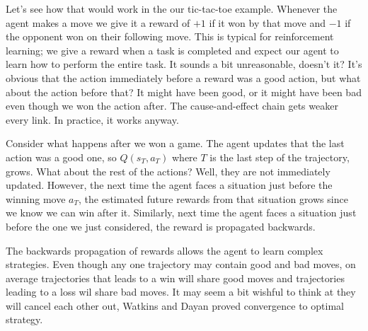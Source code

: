 \documentclass{article}
\theoremstyle{changedot}
\theoremstyle{changedotbreak}
\theoremstyle{nonumberplain}
\begin{document}
Let's see how that would work in the our tic-tac-toe example. Whenever the agent makes a move we give it a reward of $+1$ if it won by that move and $-1$ if the opponent won on their following move. This is typical for reinforcement learning; we give a reward when a task is completed and expect our agent to learn how to perform the entire task. It sounds a bit unreasonable, doesn't it? It's obvious that the action immediately before a reward was a good action, but what about the action before that? It might have been good, or it might have been bad even though we won the action after. The cause-and-effect chain gets weaker every link. In practice, it works anyway.

Consider what happens after we won a game. The agent updates that the last action was a good one, so $Q(s_{T}, a_{T})$ where $T$ is the last step of the trajectory, grows. What about the rest of the actions? Well, they are not immediately updated. However, the next time the agent faces a situation just before the winning move $a_{T}$, the estimated future rewards from that situation grows since we know we can win after it. Similarly, next time the agent faces a situation just before the one we just considered, the reward is propagated backwards.

The backwards propagation of rewards allows the agent to learn complex strategies. Even though any one trajectory may contain good and bad moves, on average trajectories that leads to a win will share good moves and trajectories leading to a loss wil share bad moves. It may seem a bit wishful to think at they will cancel each other out, Watkins and Dayan proved convergence to optimal strategy.







\end{document}
